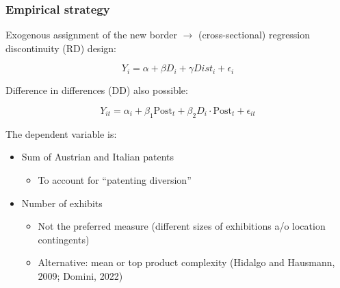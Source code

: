 \documentclass[10pt]{beamer}
\begin{document}
\begin{frame}
    \frametitle{Empirical strategy}
    
    Exogenous assignment of the new border $\rightarrow$ (cross-sectional) regression discontinuity (RD) design:    

    \begin{equation*}
        Y_{i} = \alpha + \beta D_i + \gamma Dist_i + \epsilon_i 
    \end{equation*}

    \bigskip
    
    Difference in differences (DD) also possible:

    \begin{equation*}
        Y_{it} = \alpha_i + \beta_1 \text{Post}_t + \beta_2 D_i \cdot \text{Post}_t + \epsilon_{it}
    \end{equation*}

    \bigskip

    The dependent variable is:

    \begin{itemize}
    
        \item Sum of Austrian and Italian patents
        \begin{itemize}
            \item To account for ``patenting diversion''
        \end{itemize}

        \item Number of exhibits
        \begin{itemize}
            \item Not the preferred measure (different sizes of exhibitions a/o location contingents)
            \item Alternative: mean or top product complexity (Hidalgo and Hausmann, 2009; Domini, 2022) 
        \end{itemize}
    
    \end{itemize}
    
    \bigskip

\end{frame}
\end{document}
